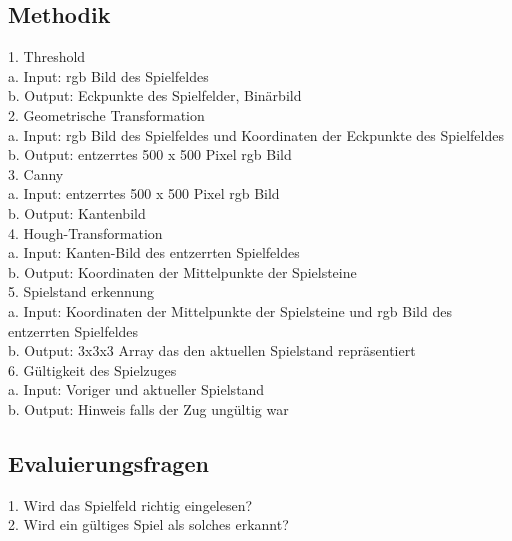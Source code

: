 \documentclass[paper=A4, deutsch]{scrartcl}
\begin{document}
\subsection{Methodik}
1.  Threshold\\
\hspace*{1em} a. Input: rgb Bild des Spielfeldes\\
\hspace*{1em} b. Output: Eckpunkte des Spielfelder, Binärbild\\
2. Geometrische Transformation\\
\hspace*{1em} a. Input: rgb Bild des Spielfeldes und Koordinaten der Eckpunkte des Spielfeldes\\
\hspace*{1em} b. Output: entzerrtes 500 x 500 Pixel rgb Bild\\
3. Canny\\
\hspace*{1em} a. Input: entzerrtes 500 x 500 Pixel rgb Bild\\
\hspace*{1em} b. Output: Kantenbild \\
4. Hough-Transformation \\
\hspace*{1em} a. Input: Kanten-Bild des entzerrten Spielfeldes\\
\hspace*{1em} b. Output: Koordinaten der Mittelpunkte der Spielsteine \\
5. Spielstand erkennung \\
\hspace*{1em} a. Input: Koordinaten der Mittelpunkte der Spielsteine und rgb Bild des entzerrten Spielfeldes\\
\hspace*{1em} b. Output: 3x3x3 Array das den aktuellen Spielstand repräsentiert \\
6. Gültigkeit des Spielzuges\\
\hspace*{1em} a. Input: Voriger und aktueller Spielstand \\
\hspace*{1em} b. Output: Hinweis falls der Zug ungültig war

\subsection{Evaluierungsfragen}
1. Wird das Spielfeld richtig eingelesen?\\
2. Wird ein gültiges Spiel als solches erkannt?\\
\end{document}
